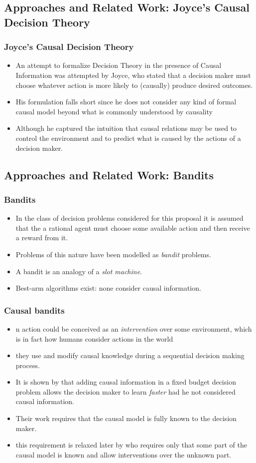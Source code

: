 \documentclass{beamer}
\theoremstyle{plain}
\begin{document}
\subsection{Approaches and Related Work: Joyce's Causal Decision Theory}
\begin{frame}
\frametitle{Joyce's Causal Decision Theory}
\begin{itemize}
\item An attempt to formalize Decision Theory in the presence of Causal Information was attempted by Joyce, who stated that a decision maker must choose whatever action is more likely to (causally) produce desired outcomes.
\item  His formulation falls short since he does not consider any kind of formal causal model beyond what is commonly understood by causality
\item Although he captured the intuition that causal relations may be used to control the environment and to predict what is caused by the actions of a decision maker.
\end{itemize}
\end{frame}
\subsection{Approaches and Related Work: Bandits}
\begin{frame}
\frametitle{Bandits}
\begin{itemize}
\item In the class of decision problems considered for this proposal it is assumed that the a rational agent must choose some available action and then receive a reward from it.
\item Problems of this nature have been modelled as \textit{bandit} problems.
\item A bandit is an analogy of a \textit{slot machine}.
\item Best-arm algorithms exist: none consider causal information.
\end{itemize}
\end{frame}
\begin{frame}
\frametitle{Causal bandits}
\begin{itemize}
\item n action could be conceived as an \textit{intervention} over some environment, which is in fact how humans consider actions in the world
\item they use and modify causal knowledge during a sequential decision making process.
\item It is shown by \cite{lattimoreNIPS2016} that adding causal information in a fixed budget decision problem allows the decision maker to learn \textit{faster} had he not considered causal information.
\item Their work requires that the causal model is fully known to the decision maker.
\item this requirement is relaxed later by \cite{sen2017identifying} who requires only that some part of the causal model is known and allow interventions over the unknown part. 
\end{itemize}
\end{frame}
\end{document}
